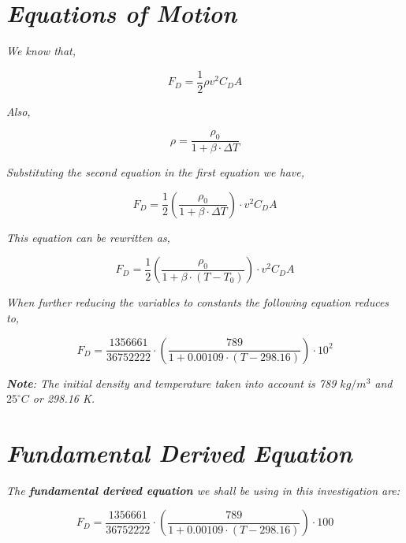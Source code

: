
\section{\textit{Equations of Motion}}
            
   \textit{We know that,}
            
		$$F_D = \frac{1}{2}\rho v^2C_DA$$

	\textit{Also,}
		
		$$\rho = \frac{\rho_{0}}{1 + \beta\cdot\Delta T}$$

	\textit{Substituting the second equation in the first equation we have,}
	
		$$F_D = \frac{1}{2}\left(\frac{\rho_{0}}{1 + \beta\cdot\Delta T}\right)\cdot v^2C_DA$$

	\textit{This equation can be rewritten as,}

		$$F_D = \frac{1}{2}\left(\frac{\rho_{0}}{1 + \beta\cdot(T - T_{0})}\right)\cdot v^2C_DA$$

	\textit{When further reducing the variables to constants the following equation reduces to,}

		$$F_D = \frac{1356661}{36752222}\cdot\left(\frac{789}{1 + 0.00109\cdot(T - 298.16)}\right)\cdot 10^2$$

	\textit{\textbf{Note}: The initial density and temperature taken into account is 789 $kg/m^3$ and ${25}^\circ C$ or 298.16 K.}

\section{\textit{Fundamental Derived Equation}}

	\textit{The \textbf{fundamental derived equation} we shall be using in this investigation are:}
            
   	\begin{equation}
      	F_D = \frac{1356661}{36752222}\cdot\left(\frac{789}{1 + 0.00109\cdot(T - 298.16)}\right)\cdot 100
      	\label{eq1}
    	\end{equation}
            
            
            




